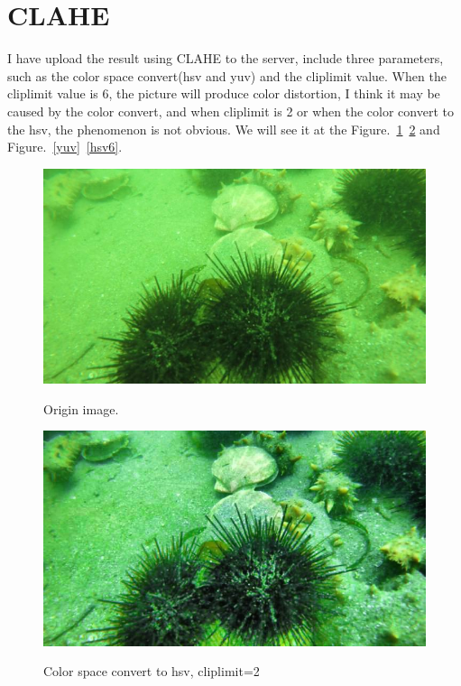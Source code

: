 \documentclass[10pt,twocolumn,letterpaper]{article}
\begin{document}
	\section{CLAHE}
	\par I have upload the result using CLAHE to the server, include three parameters, such as the color space convert(hsv and yuv) and the cliplimit value. When the cliplimit value is 6, the picture will produce color distortion, I think it may be caused by the color convert, and when cliplimit is 2 or when the color convert to the hsv, the phenomenon is not obvious. We will see it at the Figure.~\ref{orim}~\ref{hsv2} and Figure.~\ref{yuv}~\ref{hsv6}. 
	\begin{figure}[htbp]
			\centering{}
			\includegraphics[width=0.9\linewidth]{00076.jpg}\\
			\caption{Origin image. }
			\label{orim}
    \end{figure}	
    \begin{figure}[htbp]		
			\centering{}
			\includegraphics[width=0.9\linewidth]{0076.jpg}\\
			\caption{Color space convert to hsv, cliplimit=2}
			\label{hsv2}
	\end{figure}
\end{document}
